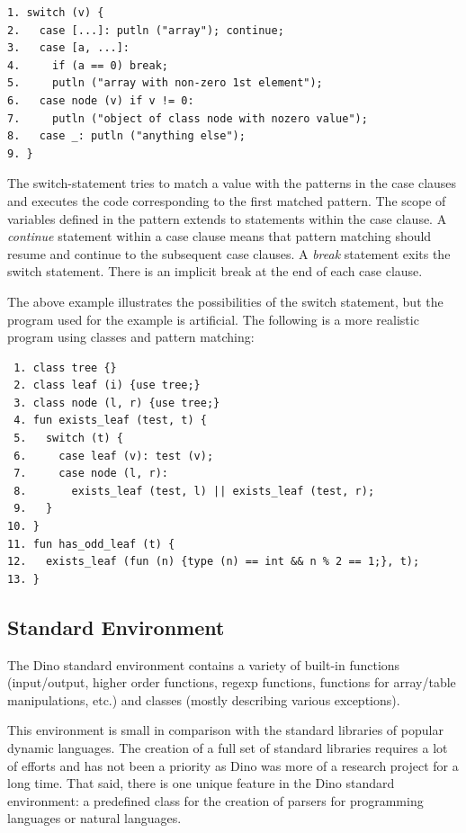 \documentclass[preprint]{sigplanconf}
\begin{document}
{\footnotesize
\begin{verbatim}
1. switch (v) {
2.   case [...]: putln ("array"); continue;
3.   case [a, ...]:
4.     if (a == 0) break;
5.     putln ("array with non-zero 1st element");
6.   case node (v) if v != 0:
7.     putln ("object of class node with nozero value");
8.   case _: putln ("anything else");
9. }
\end{verbatim}
}

The switch-statement tries to match
a value with the patterns in the case clauses and
executes the code corresponding to the first matched pattern.  The scope
of variables defined in the pattern extends to statements within the case clause.
A \emph{continue} statement within a case clause means that pattern matching should resume and continue to the subsequent case clauses. A \emph{break} statement exits the switch
statement.  There is an implicit break at the end of each case clause.

The above example illustrates the possibilities of the switch statement, but
the program used for the example is artificial. The following is a more
realistic program using classes and pattern matching:

{\scriptsize
\begin{verbatim}
 1. class tree {}
 2. class leaf (i) {use tree;}
 3. class node (l, r) {use tree;}
 4. fun exists_leaf (test, t) {
 5.   switch (t) {
 6.     case leaf (v): test (v);
 7.     case node (l, r):
 8.       exists_leaf (test, l) || exists_leaf (test, r);
 9.   }
10. }
11. fun has_odd_leaf (t) {
12.   exists_leaf (fun (n) {type (n) == int && n % 2 == 1;}, t);
13. }
\end{verbatim}
}

\subsection{Standard Environment}

The Dino standard environment contains a variety of built-in functions
(input/output, higher order functions, regexp functions, functions for
array/table manipulations, etc.) and classes (mostly describing
various exceptions).

This environment is small in comparison with the standard libraries of popular dynamic
languages. The creation of a full set of standard libraries requires a lot of
efforts and has not been a priority as Dino was more of a research project for a long time.  That said, there
is one unique feature in the Dino standard environment: a
predefined class for the creation of parsers for programming languages or
natural languages.
\end{document}
